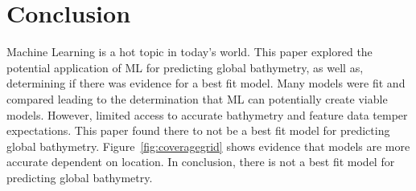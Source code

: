 \section{Conclusion}
\setlength{\parindent}{10ex}
Machine Learning is a hot topic in today's world.
This paper explored the potential application of \ac{ML} for predicting global bathymetry, as well as, determining if there was evidence for a best fit model.
Many models were fit and compared leading to the determination that \ac{ML} can potentially create viable models.
However, limited access to accurate bathymetry and feature data temper expectations.
This paper found there to not be a best fit model for predicting global bathymetry. 
Figure~\ref{fig:coveragegrid} shows evidence that models are more accurate dependent on location.
In conclusion, there is not a best fit model for predicting global bathymetry.